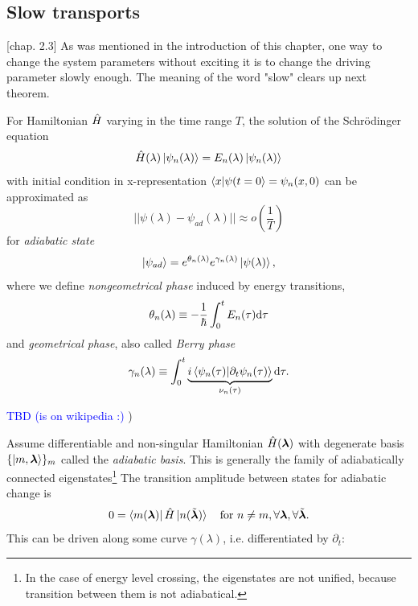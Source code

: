\subsection{Slow transports}
\citep{kolodrubez}[chap. 2.3]
As was mentioned in the introduction of this chapter, one way to change the system parameters without exciting it is to change the driving parameter slowly enough. The meaning of the word "slow" clears up next theorem.
\begin{thm}
    \label{adiabaticTheorem}
    For Hamiltonian $\hat{H}$ varying in the time range $T$, the solution of the Schrödinger equation 
    $$\hat{H}(\lambda)\ket{\psi_n(\lambda)} = E_n(\lambda)\ket{\psi_n(\lambda)}$$
    with initial condition in x-representation $\braket{x|\psi(t=0}=\psi_n(x,0)$ can be approximated as
    \begin{equation}
      ||\psi(\lambda) - \psi_{ad}(\lambda)||\approx o\left(\frac{1}{T}\right)
    \end{equation}
    for \emph{adiabatic state}
    \begin{equation}
        \ket{\psi_{ad}}= e^{\theta_n(\lambda)}e^{\gamma_n(\lambda)}\ket{\psi(\lambda)},
    \end{equation}
    where we define \emph{nongeometrical phase} induced by energy transitions,
    $$\theta_n(\lambda)\equiv -\frac{1}{\hbar}\int_0^t E_n(\tau)\mathrm{d} \tau$$
    and \emph{geometrical phase}, also called \emph{Berry phase}
        $$\gamma_n(\lambda)\equiv \int_0^t \underbrace{i\braket{\psi_n(\tau)|\partial_t\psi_n(\tau)}}_{\nu_n(\tau)} \mathrm{d} \tau .$$
\end{thm}
\begin{myproof}
    \textcolor{blue}{TBD (is on wikipedia :)} )
\end{myproof}
Assume differentiable and non-singular Hamiltonian $\hat{H}({\bm\lambda})$ with degenerate basis $\{\ket{m,{\bm\lambda}}\}_m$ called the \emph{adiabatic basis}. This is generally the family of adiabatically connected eigenstates\footnote{In the case of energy level crossing, the eigenstates are not unified, because transition between them is not adiabatical.} The transition amplitude between states for adiabatic change is
\begin{equation}
    0=\bra{m({\bm\lambda})}\hat{H}\ket{n(\tilde{{\bm\lambda}})} \quad \text{for }n\neq m, \forall {\bm\lambda},\forall \tilde {{\bm\lambda}}.
\end{equation}
This can be driven along some curve $\gamma(\lambda)$, i.e. differentiated by $\partial_t$:
